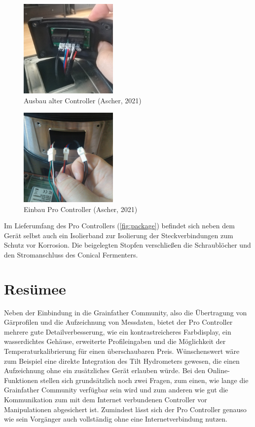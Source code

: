 \documentclass[a4paper,parskip=half]{scrartcl}
\begin{document}
\begin{figure}[H]
\centering
\includegraphics[width=4.8cm]{images/gfpc_install_old.jpg}
\caption{Ausbau alter Controller (Ascher, 2021)}
\label{fig:installold}
\end{figure}

\begin{figure}[H]
\centering
\includegraphics[width=4.8cm]{images/gfpc_install_new.jpg}
\caption{Einbau Pro Controller (Ascher, 2021)}
\label{fig:installnew}
\end{figure}

Im Lieferumfang des Pro Controllers (\autoref{fig:package})
befindet sich neben dem Gerät selbst auch ein Isolierband
zur Isolierung der Steckverbindungen zum Schutz vor
Korrosion. Die beigelegten Stopfen verschließen die
Schraublöcher und den Stromanschluss des Conical Fermenters.

\section*{Resümee}

Neben der Einbindung in die Grainfather Community, also die
Übertragung von Gärprofilen und die Aufzeichnung von
Messdaten, bietet der Pro Controller mehrere gute
Detailverbesserung, wie ein kontrastreicheres Farbdisplay,
ein wasserdichtes Gehäuse, erweiterte Profileingaben und
die Möglichkeit der Temperaturkalibrierung für einen
überschaubaren Preis. Wünschenswert wäre zum Beispiel
eine direkte Integration des Tilt Hydrometers
gewesen, die einen Aufzeichnung ohne ein zusätzliches
Gerät erlauben würde. Bei den Online-Funktionen stellen sich
grundsätzlich noch zwei Fragen, zum einen, wie lange die
Grainfather Community verfügbar sein wird und zum anderen wie
gut die Kommunikation zum mit dem Internet verbundenen Controller
vor Manipulationen abgesichert ist. Zumindest lässt sich der Pro
Controller genauso wie sein Vorgänger auch vollständig ohne eine
Internetverbindung nutzen.
\end{document}
